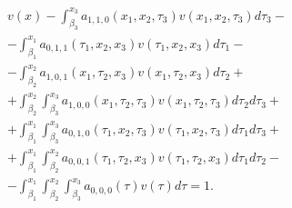 \begin{multline}

v(x)-\int_{\beta _3 }^{x_3 }a_{1, 1, 0}\left( x_1 ,x_2 ,\tau_3 \right) v\left( x_1 ,x_2 ,\tau _3 \right) d\tau_3 -

\\

-\int_{\beta _1 }^{x_1 }a_{0, 1, 1}\left( \tau_1 ,x_2 ,x_3 \right) v\left( \tau _1 ,x_2 ,x_3 \right) d\tau _1 -


\\


-\int_{\beta _2 }^{x_2 }a_{1, 0, 1}\left( x_1 ,\tau_2 ,x_3 \right) v\left( x_1 ,\tau _2 ,x_3 \right) d\tau_2 +

\\

+\int_{\beta _2 }^{x_2 }\int_{\beta_3 }^{x_3 }a_{1, 0, 0}\left( x_1 ,\tau _2 ,\tau _3 \right) v\left(x_1 ,\tau _2 ,\tau _3 \right) d\tau_2 d\tau _3 +


\\


+\int_{\beta _1 }^{x_1 }\int_{\beta_3 }^{x_3 }a_{0, 1, 0}\left( \tau _1 ,x_2 ,\tau _3 \right) v\left( \tau_1 ,x_2 ,\tau _3 \right) d\tau _1 d\tau _3 +


\\


+\int_{\beta _1 }^{x_1 }\int_{\beta_2 }^{x_2 }a_{0, 0, 1}\left( \tau _1 ,\tau _2 ,x_3 \right) v\left( \tau_1 ,\tau _2 ,x_3 \right) d\tau _1 d\tau _2 -

\\

-\int_{\beta_1 }^{x_1 }\int_{\beta _2 }^{x_2 }\int_{\beta_3 }^{x_3 }a_{0, 0, 0}\left( \tau \right) v\left( \tau \right) d\tau=1.%

\label{1ast}

\end{multline}



